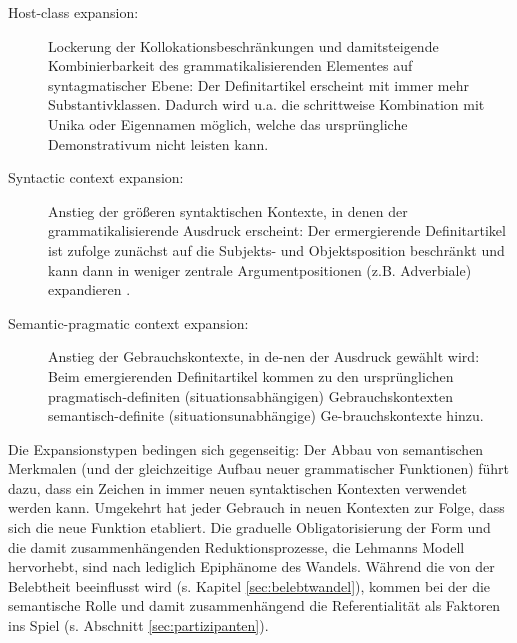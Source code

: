 \begin{description}
\item[Host-class expansion:] Lockerung der Kollokationsbeschränkungen und damit\linebreak steigende Kombinierbarkeit des grammatikalisierenden Elementes auf syntagmatischer Ebene: Der Definitartikel erscheint mit immer mehr Substantivklassen. Dadurch wird u.a. die schrittweise Kombination mit Unika oder Eigennamen möglich, welche das ursprüngliche Demonstrativum nicht leisten kann. 
\item[Syntactic context expansion:] Anstieg der größeren syntaktischen Kontexte, in denen der grammatikalisierende Ausdruck erscheint: Der ermergierende Definitartikel ist \textcite[32]{Himmelmann2004} zufolge zunächst auf die Subjekts- und Objektsposition beschränkt und kann dann in weniger zentrale Argumentpositionen (z.B. Adverbiale) expandieren \parencite[s. hierzu auch ausführlich][]{Himmelmann1998}. 
\item[Semantic-pragmatic context expansion:] Anstieg der Gebrauchskontexte, in de-\linebreak nen der Ausdruck gewählt wird: Beim emergierenden Definitartikel kommen zu den ursprünglichen pragmatisch-definiten (situationsabhängigen) Gebrauchskontexten semantisch-definite (situationsunabhängige) Ge-\linebreak brauchskontexte hinzu.
\end{description}

\noindent
Die Expansionstypen bedingen sich gegenseitig: Der Abbau von semantischen Merkmalen (und der gleichzeitige Aufbau neuer grammatischer Funktionen) führt dazu, dass ein Zeichen in immer neuen syntaktischen Kontexten verwendet werden kann. Umgekehrt hat jeder Gebrauch in neuen Kontexten zur Folge, dass sich die neue Funktion etabliert. Die graduelle Obligatorisierung der Form und die damit zusammenhängenden Reduktionsprozesse, die Lehmanns Modell hervorhebt, sind nach \textcite[33]{Himmelmann2004} lediglich Epiphänome des Wandels. Während die  von der Belebtheit beeinflusst wird (s. Kapitel \ref{sec:belebtwandel}), kommen bei der  die semantische Rolle und damit zusammenhängend die Referentialität als Faktoren ins Spiel (s. Abschnitt \ref{sec:partizipanten}).

